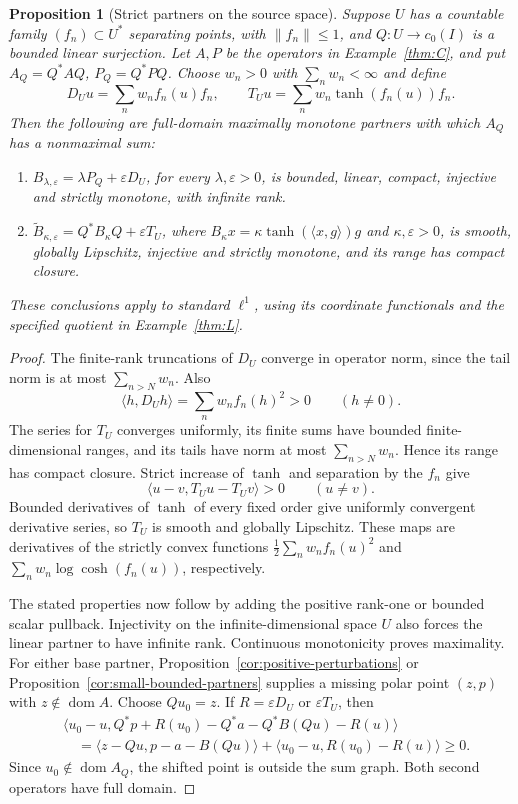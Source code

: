 \documentclass[11pt]{article}
\newcommand{\dom}{\operatorname{dom}}
\newcommand{\pair}[2]{\langle #1,#2\rangle}
\newtheorem{proposition}{Proposition}
\theoremstyle{definition}
\theoremstyle{remark}
\begin{document}
\begin{proposition}[Strict partners on the source space]
\label{cor:source-strict-partners}
Suppose $U$ has a countable family $(f_n)\subset U^*$ separating points, with $\|f_n\|\le1$, and $Q:U\to c_0(I)$ is a bounded linear surjection. Let $A,P$ be the operators in Example~\ref{thm:C}, and put $A_Q=Q^*AQ$, $P_Q=Q^*PQ$. Choose $w_n>0$ with $\sum_nw_n<\infty$ and define
\[
D_Uu=\sum_nw_nf_n(u)f_n,
\qquad
T_Uu=\sum_nw_n\tanh(f_n(u))f_n.
\]
Then the following are full-domain maximally monotone partners with which $A_Q$ has a nonmaximal sum:
\begin{enumerate}
\item $B_{\lambda,\varepsilon}=\lambda P_Q+\varepsilon D_U$, for every $\lambda,\varepsilon>0$, is bounded, linear, compact, injective and strictly monotone, with infinite rank.
\item $\widetilde B_{\kappa,\varepsilon}=Q^*B_\kappa Q+\varepsilon T_U$, where $B_\kappa x=\kappa\tanh(\pair{x}{g})g$ and $\kappa,\varepsilon>0$, is smooth, globally Lipschitz, injective and strictly monotone, and its range has compact closure.
\end{enumerate}
These conclusions apply to standard $\ell^1$, using its coordinate functionals and the specified quotient in Example~\ref{thm:L}.
\end{proposition}
\begin{proof}
The finite-rank truncations of $D_U$ converge in operator norm, since the tail norm is at most $\sum_{n>N}w_n$. Also
\[
\pair{h}{D_Uh}=\sum_nw_nf_n(h)^2>0\qquad(h\ne0).
\]
The series for $T_U$ converges uniformly, its finite sums have bounded finite-dimensional ranges, and its tails have norm at most $\sum_{n>N}w_n$. Hence its range has compact closure. Strict increase of $\tanh$ and separation by the $f_n$ give
\[
\pair{u-v}{T_Uu-T_Uv}>0\qquad(u\ne v).
\]
Bounded derivatives of $\tanh$ of every fixed order give uniformly convergent derivative series, so $T_U$ is smooth and globally Lipschitz. These maps are derivatives of the strictly convex functions $\frac12\sum_nw_nf_n(u)^2$ and $\sum_nw_n\log\cosh(f_n(u))$, respectively.

The stated properties now follow by adding the positive rank-one or bounded scalar pullback. Injectivity on the infinite-dimensional space $U$ also forces the linear partner to have infinite rank. Continuous monotonicity proves maximality. For either base partner, Proposition~\ref{cor:positive-perturbations} or Proposition~\ref{cor:small-bounded-partners} supplies a missing polar point $(z,p)$ with $z\notin\dom A$. Choose $Qu_0=z$. If $R=\varepsilon D_U$ or $\varepsilon T_U$, then
\[
\begin{aligned}
&\pair{u_0-u}{Q^*p+R(u_0)-Q^*a-Q^*B(Qu)-R(u)}\\
&\quad=\pair{z-Qu}{p-a-B(Qu)}+\pair{u_0-u}{R(u_0)-R(u)}\ge0.
\end{aligned}
\]
Since $u_0\notin\dom A_Q$, the shifted point is outside the sum graph. Both second operators have full domain.
\end{proof}
\end{document}
